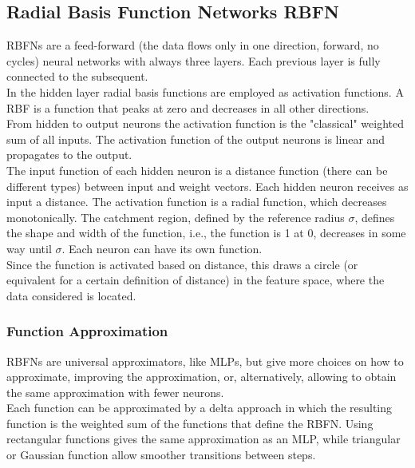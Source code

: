 \subsection{Radial Basis Function Networks RBFN}

RBFNs are a feed-forward (the data flows only in one direction, forward, no cycles) neural networks with always three layers. Each previous layer is fully connected to the subsequent.\\
In the hidden layer radial basis functions are employed as activation functions. A RBF is a function that peaks at zero and decreases in all other directions.\\

From hidden to output neurons the activation function is the "classical" weighted sum of all inputs. The activation function of the output neurons is linear and propagates to the output.\\ 

The input function of each hidden neuron is a distance function (there can be different types) between input and weight vectors. Each hidden neuron receives as input a distance. The activation function is a radial function, which decreases monotonically. The catchment region, defined by the reference radius $\sigma$, defines the shape and width of the function, i.e., the function is 1 at 0, decreases in some way until $\sigma$. Each neuron can have its own function.\\ 
Since the function is activated based on distance, this draws a circle (or equivalent for a certain definition of distance) in the feature space, where the data considered is located.\\

\subsubsection{Function Approximation}
RBFNs are universal approximators, like MLPs, but give more choices on how to approximate, improving the approximation, or, alternatively, allowing to obtain the same approximation with fewer neurons.\\

Each function can be approximated by a delta approach in which the resulting function is the weighted sum of the functions that define the RBFN. Using rectangular functions gives the same approximation as an MLP, while triangular or Gaussian function allow smoother transitions between steps.\\

